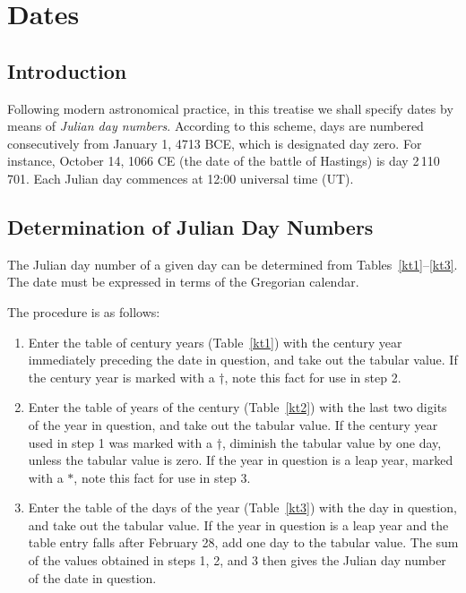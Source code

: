 \chapter{Dates}
\section{Introduction}
Following modern astronomical practice, in this treatise we shall specify dates
by means of {\em Julian day numbers}. According to this
scheme, days are numbered consecutively from January 1, 4713 BCE, which
is designated day zero. For instance, October 14, 1066 CE (the date of the battle of Hastings) is
day 2\,110\,701. Each Julian day commences at 12:00 universal time (UT). 

\section{Determination of Julian Day Numbers}
The Julian day number of a given day can be determined from Tables~\ref{kt1}--\ref{kt3}.  The
date must be expressed in terms of the Gregorian calendar. 

The procedure is as
follows:
\begin{enumerate}
\item Enter the table of century years (Table~\ref{kt1}) with the century
year immediately preceding the  date in question, and take out the tabular
value. If the
century year is marked with a $\dag$, note this fact for use in step 2.
\item Enter the table of years of the century (Table~\ref{kt2}) with the
last two digits of the year in question, and take out the tabular value.
If the century year used in step 1 was marked with a $\dag$, diminish the tabular value
by one day, unless the tabular value is zero. If the year in question
is a leap year,  marked with a $\ast$, note this fact for use in step 3.

\item Enter the table of the days of the year (Table~\ref{kt3}) with the
day in question, and take out the tabular value. If the year in question
is a leap year and the table entry falls after February 28, add
one day to the tabular value. The sum of the values obtained
in steps 1, 2, and 3 then gives the Julian day number of the date in question.
\end{enumerate}

